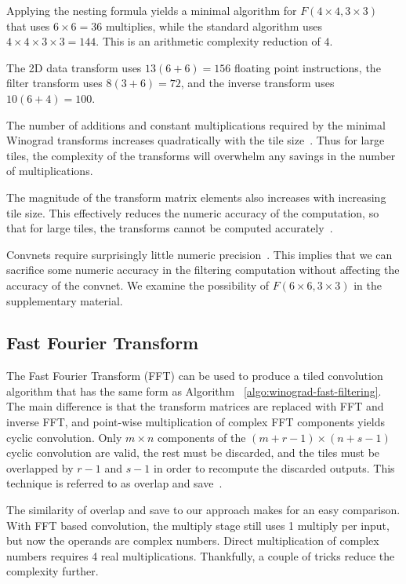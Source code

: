 \documentclass[10pt,twocolumn,letterpaper]{article}
\begin{document}
Applying the nesting formula yields a minimal algorithm for $F(4 \times 4, 3 \times 3)$ that uses $6 \times 6 = 36$ multiplies, while the standard algorithm uses $4 \times 4 \times 3 \times 3 = 144$. This is an arithmetic complexity reduction of $4$.

The 2D data transform uses $13(6+6) = 156$ floating point instructions, the filter transform uses $8(3+6) = 72$, and the inverse transform uses $10(6+4)=100$.

The number of additions and constant multiplications required by the minimal Winograd transforms increases quadratically with the tile size~\cite[p.~211]{madisetti2010digital}. Thus for large tiles, the complexity of the transforms will overwhelm any savings in the number of multiplications.

The magnitude of the transform matrix elements also increases with increasing tile size. This effectively reduces the numeric accuracy of the computation, so that for large tiles, the transforms cannot be computed accurately~\cite[p.~28]{winograd1980arithmetic}.

Convnets require surprisingly little numeric precision~\cite{DBLP:journals/corr/CourbariauxBD14,gupta2015deep}. This implies that we can sacrifice some numeric accuracy in the filtering computation without affecting the accuracy of the convnet. We examine the possibility of $F(6 \times 6, 3 \times 3)$ in the supplementary material.

\subsection{Fast Fourier Transform}

The Fast Fourier Transform (FFT) can be used to produce a tiled convolution algorithm that has the same form as Algorithm ~\ref{algo:winograd-fast-filtering}. The main difference is that the transform matrices are replaced with FFT and inverse FFT, and point-wise multiplication of complex FFT components yields cyclic convolution. Only $m \times n$ components of the $(m+r-1) \times (n+s-1)$ cyclic convolution are valid, the rest must be discarded, and the tiles must be overlapped  by $r-1$ and $s-1$ in order to recompute the discarded outputs. This technique is referred to as overlap and save~\cite[p.~195]{blahut2010fast}.

The similarity of overlap and save to our approach makes for an easy comparison. With FFT based convolution, the multiply stage still uses 1 multiply per input, but now the operands are complex numbers. Direct multiplication of complex numbers requires 4 real multiplications. Thankfully, a couple of tricks reduce the complexity further.
\end{document}
